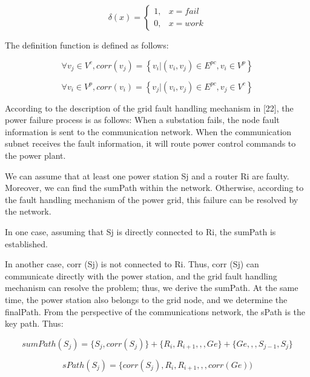 \documentclass[AMA,STIX1COL]{WileyNJD-v2}
\begin{document}
\begin{equation} 
\delta (x)=\left\{\begin{matrix}
1, &  x=fail \\ 
0,&  x=work
\end{matrix}\right.
\end{equation}

\par The definition function is defined as follows:

\begin{equation} 
\forall v_{j}\in V^{c}, corr(v_{j})=\left \{v_{i} |(v_{i}, v_{j}) \in E^{pc}, v_{i}\in V^{p} \right \}
\end{equation}

\begin{equation} 
\forall v_{i}\in V^{p}, corr(v_{i})=\left \{v_{j} |(v_{i}, v_{j}) \in E^{pc}, v_{j}\in V^{c} \right \}
\end{equation}

\par According to the description of the grid fault handling mechanism in [22], the power failure process is as follows: When a substation fails, the node fault information is sent to the communication network. When the communication subnet receives the fault information, it will route power control commands to the power plant. 

\par We can assume that at least one power station Sj and a router Ri are faulty. Moreover, we can find the sumPath within the network. Otherwise, according to the fault handling mechanism of the power grid, this failure can be resolved by the network. 
\par In one case, assuming that Sj is directly connected to Ri, the sumPath is established. 
\par In another case, corr (Sj) is not connected to Ri. Thus, corr (Sj) can communicate directly with the power station, and the grid fault handling mechanism can resolve the problem; thus, we derive the sumPath. At the same time, the power station also belongs to the grid node, and we determine the finalPath. From the perspective of the communications network, the sPath is the key path. Thus:

\begin{equation} 
sumPath(S_{j}) = \{S_{j}, corr(S_{j})\} + \{R_{i}, R_{i+1},,,Ge\} + \{Ge,,,S_{j-1},S_{j}\}
\end{equation}

\begin{equation} 
sPath(S_{j}) = \{corr(S_{j}),R_{i}, R_{i+1},,,corr(Ge))
\end{equation}
\end{document}

